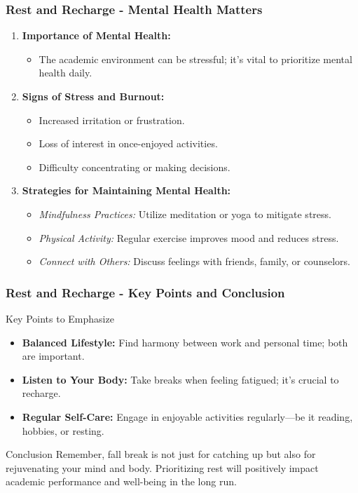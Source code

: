 \documentclass[aspectratio=169]{beamer}
\begin{document}
\begin{frame}[fragile]
    \frametitle{Rest and Recharge - Mental Health Matters}
    \begin{enumerate}
        \item \textbf{Importance of Mental Health:}
        \begin{itemize}
            \item The academic environment can be stressful; it's vital to prioritize mental health daily.
        \end{itemize}
        
        \item \textbf{Signs of Stress and Burnout:}
        \begin{itemize}
            \item Increased irritation or frustration.
            \item Loss of interest in once-enjoyed activities.
            \item Difficulty concentrating or making decisions.
        \end{itemize}
        
        \item \textbf{Strategies for Maintaining Mental Health:}
        \begin{itemize}
            \item \textit{Mindfulness Practices:} Utilize meditation or yoga to mitigate stress.
            \item \textit{Physical Activity:} Regular exercise improves mood and reduces stress.
            \item \textit{Connect with Others:} Discuss feelings with friends, family, or counselors.
        \end{itemize}
    \end{enumerate}
\end{frame}

\begin{frame}[fragile]
    \frametitle{Rest and Recharge - Key Points and Conclusion}
    \begin{block}{Key Points to Emphasize}
        \begin{itemize}
            \item \textbf{Balanced Lifestyle:} Find harmony between work and personal time; both are important.
            \item \textbf{Listen to Your Body:} Take breaks when feeling fatigued; it's crucial to recharge.
            \item \textbf{Regular Self-Care:} Engage in enjoyable activities regularly—be it reading, hobbies, or resting.
        \end{itemize}
    \end{block}
    
    \begin{block}{Conclusion}
        Remember, fall break is not just for catching up but also for rejuvenating your mind and body. Prioritizing rest will positively impact academic performance and well-being in the long run.
    \end{block}
\end{frame}
\end{document}
